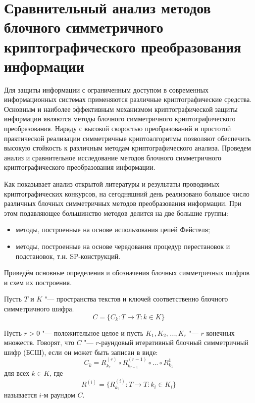 \section{Сравнительный анализ методов блочного симметричного криптографического
преобразования информации}

Для защиты информации с ограниченным доступом в современных информационных
системах применяются различные криптографические средства. Основным и наиболее
эффективным механизмом криптографической защиты информации являются методы
блочного симметричного криптографического преобразования. Наряду с высокой
скоростью преобразований и  простотой практической реализации симметричные
криптоалгоритмы позволяют обеспечить высокую стойкость к различным методам
криптографического анализа. Проведем анализ и сравнительное исследование методов
блочного симметричного  криптографического преобразования информации.

Как показывает анализ открытой литературы и результаты проводимых
криптографических конкурсов, на сегодняшний день реализовано большое число
различных блочных симметричных методов преобразования информации. При этом
подавляющее большинство методов делится на две большие группы: 

\begin{itemize}

    \item методы, построенные на основе использования цепей Фейстеля;

    \item методы, построенные на основе чередования процедур перестановок и
    подстановок, т.н. SP-конструкций. 

\end{itemize}

Приведём основные определения и обозначения блочных симметричных шифров и схем
их построения.

Пусть $T$ и $K$ "--- пространства текстов и ключей соответственно блочного
симметричного шифра.
\begin{equation}C = \{C_k: T \rightarrow T: k \in K\}\end{equation}

Пусть $r > 0$ "--- положительное целое и пусть $K_1, K_2, \ldots, K_r$ "--- $r$
конечных множеств. Говорят, что $C$ "--- $r$-раундовый итеративный блочный
симметричный шифр (БСШ), если он может быть записан в виде:
\begin{equation}C_k = R^{(r)}_{k_r} \circ R^{(r-1)}_{k_{r-1}} \circ \ldots \circ
R^{1}_{k_1}\end{equation}
для всех $k \in K$, где
\begin{equation}R^{(i)} = \{R^{(i)}_{k_i}: T \rightarrow T: k_i \in
K_i\}\end{equation}
называется $i$-м раундом $C$. 

